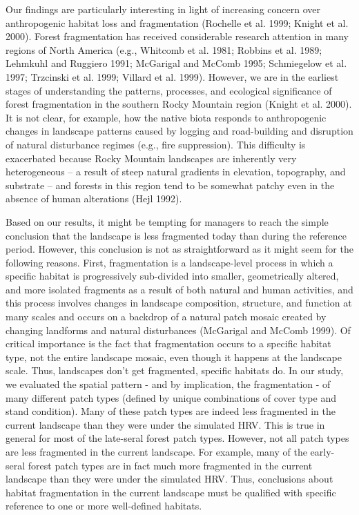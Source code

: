 Our findings are particularly interesting in light of increasing concern over anthropogenic habitat loss and fragmentation (Rochelle et al. 1999; Knight et al. 2000). Forest fragmentation has received considerable research attention in many regions of North America (e.g., Whitcomb et al. 1981; Robbins et al. 1989; Lehmkuhl and Ruggiero 1991; McGarigal and McComb 1995; Schmiegelow et al. 1997; Trzcinski et al. 1999; Villard et al. 1999). However, we are in the earliest stages of understanding the patterns, processes, and ecological significance of forest fragmentation in the southern Rocky Mountain region (Knight et al. 2000). It is not clear, for example, how the native biota responds to anthropogenic changes in landscape patterns caused by logging and road-building and disruption of natural disturbance regimes (e.g., fire suppression). This difficulty is exacerbated because Rocky Mountain landscapes are inherently very heterogeneous – a result of steep natural gradients in elevation, topography, and substrate – and forests in this region tend to be somewhat patchy even in the absence of human alterations (Hejl 1992).

Based on our results, it might be tempting for managers to reach the simple conclusion that the landscape is less fragmented today than during the reference period. However, this conclusion is not as straightforward as it might seem for the following reasons. First, fragmentation is a landscape-level process in which a specific habitat is progressively sub-divided into smaller, geometrically altered, and more isolated fragments as a result of both natural and human activities, and this process involves changes in landscape composition, structure, and function at many scales and occurs on a backdrop of a natural patch mosaic created by changing landforms and natural disturbances (McGarigal and McComb 1999). Of critical importance is the fact that fragmentation occurs to a specific habitat type, not the entire landscape mosaic, even though it happens at the landscape scale. Thus, landscapes don’t get fragmented, specific habitats do. In our study, we evaluated the spatial pattern - and by implication, the fragmentation - of many different patch types (defined by unique combinations of cover type and stand condition). Many of these patch types are indeed less fragmented in the current landscape than they were under the simulated HRV. This is true in general for most of the late-seral forest patch types. However, not all patch types are less fragmented in the current landscape. For example, many of the early-seral forest patch types are in fact much more fragmented in the current landscape than they were under the simulated HRV. Thus, conclusions about habitat fragmentation in the current landscape must be qualified with specific reference to one or more well-defined habitats.


